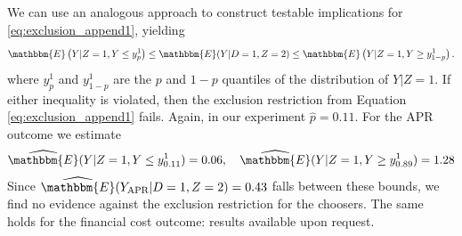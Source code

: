\begin{appendix}
We can use an analogous approach to construct testable implications for \ref{eq:exclusion_append1}, yielding 
\begin{equation}
\mathbbm{E}\left(Y|Z=1,Y\leq y^1_{p}\right) \leq \mathbbm{E}(Y|D=1,Z=2) \leq \mathbbm{E}\left(Y|Z=1,Y \geq y^1_{1-p}\right).
\label{eq:testable1}
\end{equation}
where $y^1_p$ and $y^1_{1-p}$ are the $p$ and $1 - p$ quantiles of the distribution of $Y|Z=1$.
If either inequality is violated, then the exclusion restriction from Equation \ref{eq:exclusion_append1} fails.
Again, in our experiment $\widehat{p}=0.11$. For the APR outcome we estimate
\[
\widehat{\mathbbm{E}}(Y|Z=1,Y\leq y^1_{0.11}) = 0.06, \quad
\widehat{\mathbbm{E}}(Y|Z=1,Y\geq y^1_{0.89}) = 1.28
\]
Since $\widehat{\mathbbm{E}}(Y_\text{APR}|D=1,Z=2) = 0.43$ falls between these bounds, we find no evidence against the exclusion restriction for the choosers. 
The same holds for the financial cost outcome: results available upon request.




\end{appendix}
